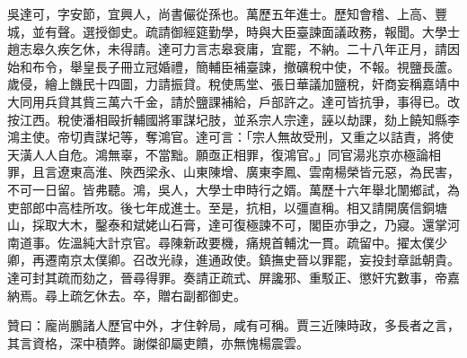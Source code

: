 \begin{pinyinscope}
吳達可，字安節，宜興人，尚書儼從孫也。萬歷五年進士。歷知會稽、上高、豐城，並有聲。選授御史。疏請御經筵勤學，時與大臣臺諫面議政務，報聞。大學士趙志皋久疾乞休，未得請。達可力言志皋衰庸，宜罷，不納。二十八年正月，請因始和布令，舉皇長子冊立冠婚禮，簡輔臣補臺諫，撤礦稅中使，不報。視鹽長蘆。歲侵，繪上饑民十四圖，力請振貸。稅使馬堂、張日華議加鹽稅，奸商妄稱嘉靖中大同用兵貸其貲三萬六千金，請於鹽課補給，戶部許之。達可皆抗爭，事得已。改按江西。稅使潘相毆折輔國將軍謀圮肢，並系宗人宗達，誣以劫課，劾上饒知縣李鴻主使。帝切責謀圮等，奪鴻官。達可言：「宗人無故受刑，又重之以詰責，將使天潢人人自危。鴻無辜，不當黜。願亟正相罪，復鴻官。」同官湯兆京亦極論相罪，且言遼東高淮、陜西梁永、山東陳增、廣東李鳳、雲南楊榮皆元惡，為民害，不可一日留。皆弗聽。鴻，吳人，大學士申時行之婿。萬歷十六年舉北闈鄉試，為吏部郎中高桂所攻。後七年成進士。至是，抗相，以彊直稱。相又請開廣信銅塘山，採取大木，鑿泰和斌姥山石膏，達可復極諫不可，閣臣亦爭之，乃寢。還掌河南道事。佐溫純大計京官。尋陳新政要機，痛規首輔沈一貫。疏留中。擢太僕少卿，再遷南京太僕卿。召改光祿，進通政使。鎮撫史晉以罪罷，妄投封章詆朝貴。達可封其疏而劾之，晉尋得罪。奏請正疏式、屏讒邪、重駁正、懲奸宄數事，帝嘉納焉。尋上疏乞休去。卒，贈右副都御史。

贊曰：龐尚鵬諸人歷官中外，才住幹局，咸有可稱。賈三近陳時政，多長者之言，其言資格，深中積弊。謝傑卻屬吏饋，亦無愧楊震雲。


\end{pinyinscope}